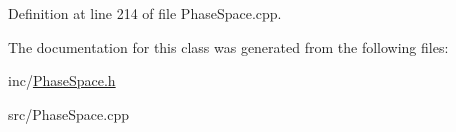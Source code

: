Definition at line 214 of file Phase\+Space.\+cpp.



The documentation for this class was generated from the following files\+:\begin{DoxyCompactItemize}
\item 
inc/\hyperlink{PhaseSpace_8h}{Phase\+Space.\+h}\item 
src/Phase\+Space.\+cpp\end{DoxyCompactItemize}
